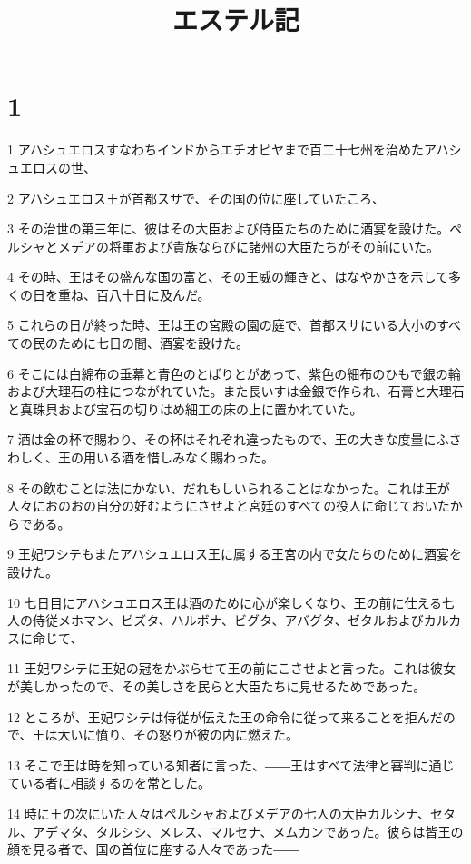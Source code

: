 

\title{エステル記}


\chapter{1}

\par 1 アハシュエロスすなわちインドからエチオピヤまで百二十七州を治めたアハシュエロスの世、
\par 2 アハシュエロス王が首都スサで、その国の位に座していたころ、
\par 3 その治世の第三年に、彼はその大臣および侍臣たちのために酒宴を設けた。ペルシャとメデアの将軍および貴族ならびに諸州の大臣たちがその前にいた。
\par 4 その時、王はその盛んな国の富と、その王威の輝きと、はなやかさを示して多くの日を重ね、百八十日に及んだ。
\par 5 これらの日が終った時、王は王の宮殿の園の庭で、首都スサにいる大小のすべての民のために七日の間、酒宴を設けた。
\par 6 そこには白綿布の垂幕と青色のとばりとがあって、紫色の細布のひもで銀の輪および大理石の柱につながれていた。また長いすは金銀で作られ、石膏と大理石と真珠貝および宝石の切りはめ細工の床の上に置かれていた。
\par 7 酒は金の杯で賜わり、その杯はそれぞれ違ったもので、王の大きな度量にふさわしく、王の用いる酒を惜しみなく賜わった。
\par 8 その飲むことは法にかない、だれもしいられることはなかった。これは王が人々におのおの自分の好むようにさせよと宮廷のすべての役人に命じておいたからである。
\par 9 王妃ワシテもまたアハシュエロス王に属する王宮の内で女たちのために酒宴を設けた。
\par 10 七日目にアハシュエロス王は酒のために心が楽しくなり、王の前に仕える七人の侍従メホマン、ビズタ、ハルボナ、ビグタ、アバグタ、ゼタルおよびカルカスに命じて、
\par 11 王妃ワシテに王妃の冠をかぶらせて王の前にこさせよと言った。これは彼女が美しかったので、その美しさを民らと大臣たちに見せるためであった。
\par 12 ところが、王妃ワシテは侍従が伝えた王の命令に従って来ることを拒んだので、王は大いに憤り、その怒りが彼の内に燃えた。
\par 13 そこで王は時を知っている知者に言った、――王はすべて法律と審判に通じている者に相談するのを常とした。
\par 14 時に王の次にいた人々はペルシャおよびメデアの七人の大臣カルシナ、セタル、アデマタ、タルシシ、メレス、マルセナ、メムカンであった。彼らは皆王の顔を見る者で、国の首位に座する人々であった――
